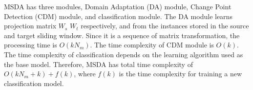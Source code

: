 MSDA has three modules, Domain Adaptation (DA) module, Change Point Detection (CDM) module, and classification module. The DA module learns projection matrix $W_s$ $W_t$ respectively, and from the instances stored in the source and target sliding window. Since it is a sequence of matrix transformation, the processing time is $O(kN_m)$. The time complexity of CDM module is $O(k)$. The time complexity of classification depends on the learning algorithm used as the base model. Therefore, MSDA has total time complexity of $O(kN_m+k)+f(k)$, where $f(k)$ is the time complexity for training a new classification model.


